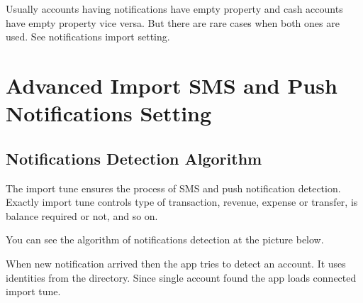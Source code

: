 \documentclass[a4paper,10pt,english]{sphinxmanual}
\begin{document}
\noindent{}

\noindent{}

\noindent{}

\sphinxAtStartPar
Usually accounts having notifications have empty  property and cash accounts
have empty  property vice versa. But there are rare cases when both ones are used. See 
notifications import setting.

\sphinxstepscope


\chapter{Advanced Import SMS and Push Notifications Setting}
\label{\detokenize{notifications:advanced-import-sms-and-push-notifications-setting}}\label{\detokenize{notifications:chapter-notifications}}\label{\detokenize{notifications::doc}}

\section{Notifications Detection Algorithm}
\label{\detokenize{notifications:notifications-detection-algorithm}}
\sphinxAtStartPar
The import tune ensures the process of SMS and push notification detection. Exactly import
tune controls type of transaction, revenue, expense or transfer, is balance required or not,
and so on.

\sphinxAtStartPar
You can see the algorithm of notifications detection at the picture below.


\sphinxAtStartPar
When new notification arrived then the app tries to detect an account. It uses identities from the
 directory. Since single account found the app loads connected import tune.
\end{document}
